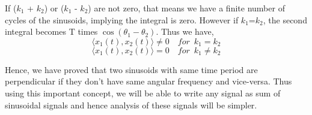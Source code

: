           
        
        
                
                If ($k_1$ + $k_2$) or ($k_1$ - $k_2$) are not zero, that means we have a finite number of cycles of the sinusoids, implying the integral is zero. However if $k_1$=$k_2$, the second integral becomes T times $\cos (\theta_1-\theta_2)$.
                Thus we have,
            \begin{equation*} \langle x_1 (t),x_2 (t) \rangle  \neq 0	\enspace \enspace		for \enspace k_1 = k_2\end{equation*}
            \begin{equation*} \langle x_1 (t),x_2 (t) \rangle = 0	\enspace \enspace		for \enspace k_1 \neq k_2\end{equation*}
                
                
                Hence, we have proved that two sinusoids with same time period are perpendicular if they don't have same angular frequency and vice-versa. Thus using this important concept, we will be able to write any signal as sum of sinusoidal signals and hence analysis of these signals will be simpler.